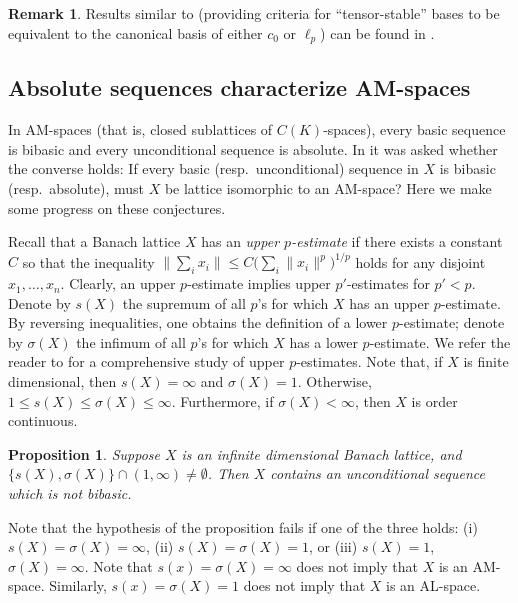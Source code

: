 \documentclass[12pt,leqno]{amsart}
\newtheorem{proposition}[theorem]{Proposition}
\numberwithin{equation}{section}
\theoremstyle{definition}
\newtheorem{remark}[theorem]{Remark}
\begin{document}
\begin{remark}\label{r:tensoring of bases}
 Results similar to  (providing criteria for ``tensor-stable'' bases to be equivalent to the canonical basis of either $c_0$ or $\ell_p$) can be found in \cite{unit-vector-bases}.
\end{remark}


\subsection{Absolute sequences characterize AM-spaces}\label{ss:bad_basic} In AM-spaces (that is, closed sublattices of $C(K)$-spaces), every basic sequence is bibasic and every unconditional sequence is absolute. In \cite{TT19} it was asked whether the converse holds: If every basic (resp.~unconditional) sequence in $X$ is bibasic (resp.~absolute), must $X$ be lattice isomorphic to an AM-space? Here we make some progress on these conjectures.
\medskip

Recall that a Banach lattice $X$ has an \emph{upper $p$-estimate} if there exists a constant $C$ so that the inequality $\| \sum_i x_i\| \leq C \big( \sum_i \|x_i\|^p \big)^{1/p}$ holds for any disjoint $x_1, \ldots, x_n$. Clearly, an upper $p$-estimate implies upper $p'$-estimates for $p' < p$. Denote by $s(X)$ the supremum of all $p$'s for which $X$ has an upper $p$-estimate. By reversing inequalities, one obtains the definition of a lower $p$-estimate; denote by $\sigma(X)$ the infimum of all $p$'s for which $X$ has a lower $p$-estimate. We refer the reader to \cite{garcia2025banach,garcia2025banach2} for a comprehensive study of upper $p$-estimates.
Note that, if $X$ is finite dimensional, then $s(X) = \infty$ and $\sigma(X) = 1$. Otherwise, $1 \leq s(X) \leq \sigma(X) \leq \infty$. Furthermore, if $\sigma(X) < \infty$, then $X$ is order continuous. %

\begin{proposition}\label{p:uncond_not_bibasic}
 Suppose $X$ is an infinite dimensional Banach lattice, and $\{s(X), \sigma(X)\} \cap (1,\infty) \neq \emptyset$. 
 Then $X$ contains an unconditional sequence which is not bibasic.
\end{proposition}

Note that the hypothesis of the proposition fails if one of the three holds: (i) $s(X) = \sigma(X) = \infty$, (ii) $s(X) = \sigma(X) = 1$, or (iii) $s(X) = 1$, $\sigma(X) = \infty$.
Note that $s(x) = \sigma(X) = \infty$ does not imply that $X$ is an AM-space.
Similarly, $s(x) = \sigma(X) = 1$ does not imply that $X$ is an AL-space.
\medskip
\end{document}
